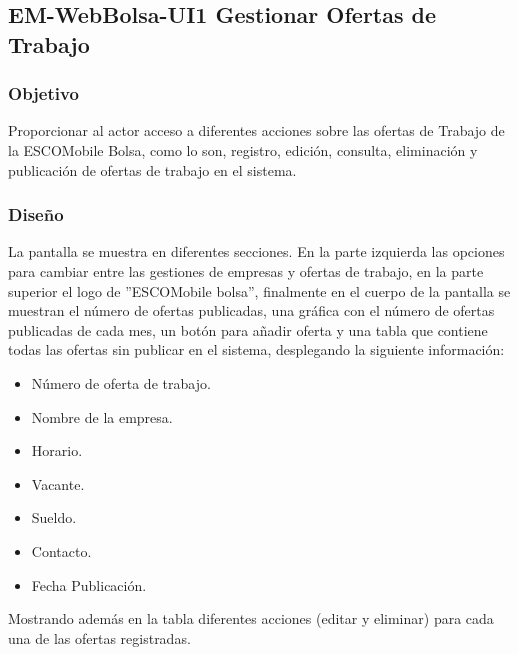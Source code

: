 \pagebreak

\subsection{EM-WebBolsa-UI1 Gestionar Ofertas de Trabajo}

\subsubsection{Objetivo}
	\noindent
	Proporcionar al actor acceso a diferentes acciones sobre las ofertas de Trabajo de la ESCOMobile Bolsa, como lo son, registro, edición, consulta, eliminación y publicación de ofertas de trabajo en el sistema. 

\subsubsection{Diseño}
	\noindent
	La pantalla se muestra en diferentes secciones. En la parte izquierda las opciones para cambiar entre las gestiones de empresas y ofertas de trabajo, en la parte superior el logo de ''ESCOMobile bolsa'', finalmente en el cuerpo de la pantalla se muestran el número de ofertas publicadas, una gráfica con el número de ofertas publicadas de cada mes, un botón para añadir oferta y una tabla que contiene todas las ofertas sin publicar en el sistema, desplegando la siguiente información:
	\begin{itemize}
         		\item Número de oferta de trabajo.
				\item Nombre de la empresa.
				\item Horario.
				\item Vacante.
				\item Sueldo.
				\item Contacto.
				\item Fecha Publicación.
				\end{itemize}	
	Mostrando además en la tabla diferentes acciones (editar y eliminar) para cada una de las ofertas registradas.


